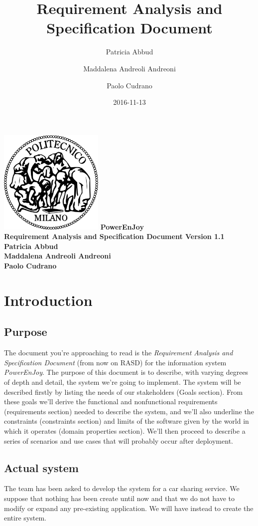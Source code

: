\documentclass[12pt, a4paper]{article}
\title{Requirement Analysis and Specification Document}
\date{2016-11-13}
\author{
	Patricia Abbud
	\and
	Maddalena Andreoli Andreoni
	\and
	Paolo Cudrano
}
\begin{document}
	\begin{titlepage}
		\centering
		\includegraphics[width=5cm]{img/polimi_logo.png} %
		\vfill
		{\bfseries\Large
			PowerEnJoy\\
			Requirement Analysis and Specification Document
			Version 1.1\\
			\vskip4cm
			Patricia Abbud\\
			Maddalena Andreoli Andreoni\\
			Paolo Cudrano\\
		}
		\vfill
		\vfill
	\end{titlepage}

	\tableofcontents
	\newpage

	\section{Introduction}
		\subsection{Purpose}
			The document you're approaching to read is the \textit{Requirement Analysis and Specification Document} (from now on RASD) for the information system \textit{PowerEnJoy}. The purpose of this document is to describe, with varying degrees of depth and detail, the system we're going to implement. The system will be described firstly by listing the needs of our stakeholders (Goals section). From these goals we'll derive the functional and nonfunctional requirements (requirements section) needed to describe the system, and we'll also underline the constraints (constraints section) and limits of the software given by the world in which it operates (domain properties section). We'll then proceed to describe a series of scenarios and use cases that will probably occur after deployment.  
			
		\subsection{Actual system}
			The team has been asked to develop the system for a car sharing service. We suppose that nothing has been create until now and that we do not have to modify or expand any pre-existing application. We will have instead to create the entire system.
		
\end{document}
